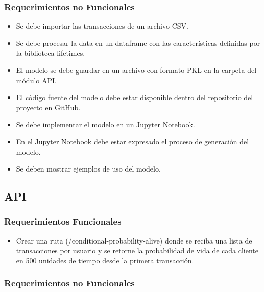 \subsubsection{Requerimientos no Funcionales}

\begin{itemize}
	\item Se debe importar las transacciones de un archivo CSV.
	\item Se debe procesar la data en un dataframe con las características definidas por la biblioteca lifetimes.
	\item El modelo se debe guardar en un archivo con formato PKL en la carpeta del módulo API.
	\item El código fuente del modelo debe estar disponible dentro del repositorio del proyecto en GitHub.
	\item Se debe implementar el modelo en un Jupyter Notebook.
	\item En el Jupyter Notebook debe estar expresado el proceso de generación del modelo.
	\item Se deben mostrar ejemplos de uso del modelo.
\end{itemize}

\subsection{API}

\subsubsection{Requerimientos Funcionales}

\begin{itemize}
	\item Crear una ruta (/conditional-probability-alive) donde se reciba una lista de transacciones por usuario y se retorne la probabilidad de vida de cada cliente en 500 unidades de tiempo desde la primera transacción.
\end{itemize}

\subsubsection{Requerimientos no Funcionales}

